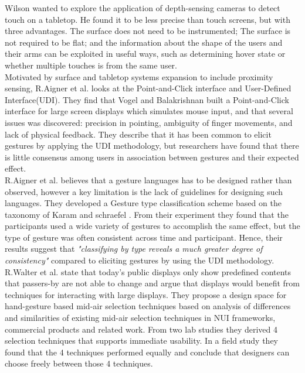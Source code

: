 Wilson \cite{Wilson:2010} wanted to explore the application of depth-sensing cameras to detect touch on a tabletop. He found it to be less precise than touch screens, but with three advantages. The surface does not need to be instrumented; The surface is not required to be flat; and the information about the shape of the users and their arms can be exploited in useful ways, such as determining hover state or whether multiple touches is from the same user. \cite{Wilson:2010}\\


Motivated by surface and tabletop systems expansion to include proximity sensing, R.Aigner et al.\cite{Aigner:2012} looks at the Point-and-Click interface and User-Defined Interface(UDI). They find that Vogel and Balakrishnan \cite{Vogel:2005} built a Point-and-Click interface for large screen displays which simulates mouse input, and that several issues was discovered: precision in pointing, ambiguity of finger movements, and lack of physical feedback. They describe that it has been common to elicit gestures by applying the UDI methodology, but researchers have found that there is little consensus among users in association between gestures and their expected effect.\\

R.Aigner et al.\cite{Aigner:2012} believes that a gesture languages has to be designed rather than observed, however a key limitation is the lack of guidelines for designing such languages.
They developed a Gesture type classification scheme based on the taxonomy of Karam and schraefel \cite{Karam:2005} .
From their experiment they found that the participants used  a  wide  variety  of  gestures  to accomplish  the  same  effect, but the  type  of  gesture was  often  consistent  across  time and participant. Hence, their results suggest that \emph{"classifying by type reveals a much greater degree of consistency"} compared to eliciting gestures by using the UDI methodology. 
\\

R.Walter et al.\cite{Walter:2014} state that today's public displays only show predeﬁned contents that passers-by are not able to change and argue that displays would beneﬁt from techniques for interacting with large displays. They propose a design space for hand-gesture based mid-air selection techniques based on analysis of differences and similarities of existing mid-air selection techniques in NUI frameworks, commercial products and related work. From two lab studies they derived 4 selection techniques that supports immediate usability. In a field study they found that the 4 techniques performed equally and conclude that designers can choose freely between those 4 techniques.\\

